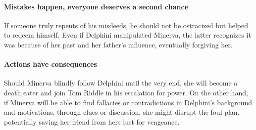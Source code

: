 \paragraph{Mistakes happen, everyone deserves a second chance}
If someone truly repents of his misdeeds, he should not be ostracized but helped to redeem himself. Even if Delphini manipulated Minerva, the latter recognizes it was because of her past and her father's influence, eventually forgiving her.

\paragraph{Actions have consequences}
Should Minerva blindly follow Delphini until the very end, she will become a death eater and join Tom Riddle in his escalation for power. On the other hand, if Minerva will be able to find fallacies or contradictions in Delphini's background and motivations, through clues or discussion, she might disrupt the foul plan, potentially saving her friend from hers lust for vengeance.
\pagebreak